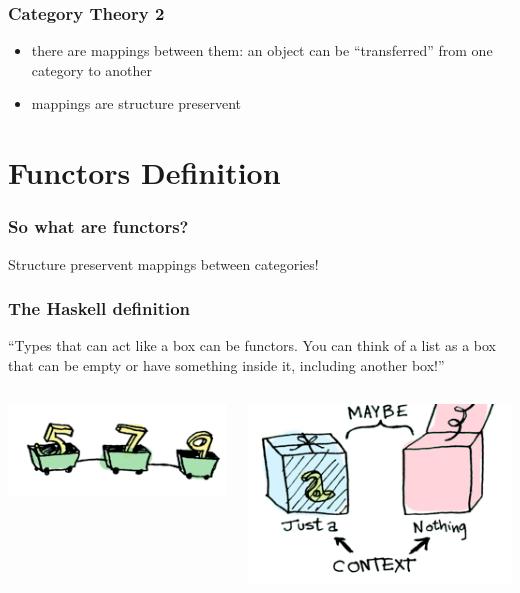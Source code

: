 \documentclass[12pt, xcolor=table]{beamer}
\begin{document}
\begin{frame}
    \frametitle{Category Theory 2}
    \begin{itemize}
        \item there are mappings between them: an object can be ``transferred'' from one category to another
        \item  mappings are structure preservent
    \end{itemize}
\end{frame}

\section{Functors Definition}
\begin{frame}
    \frametitle{So what are functors?}
    Structure preservent mappings between categories!
\end{frame}

\begin{frame}
    \frametitle{The Haskell definition}
    ``Types that can act like a box can be functors. You can think of a list as a box that can be empty or have something inside it, including another box!''
    \vspace{30px}
    \begin{columns}
            \begin{center}
            \includegraphics[scale=0.4]{figures/list.png}
            \end{center}
            \begin{center}
            \includegraphics[scale=0.4]{figures/maybe.png}
            \end{center}
    \end{columns}
\end{frame}
\end{document}
